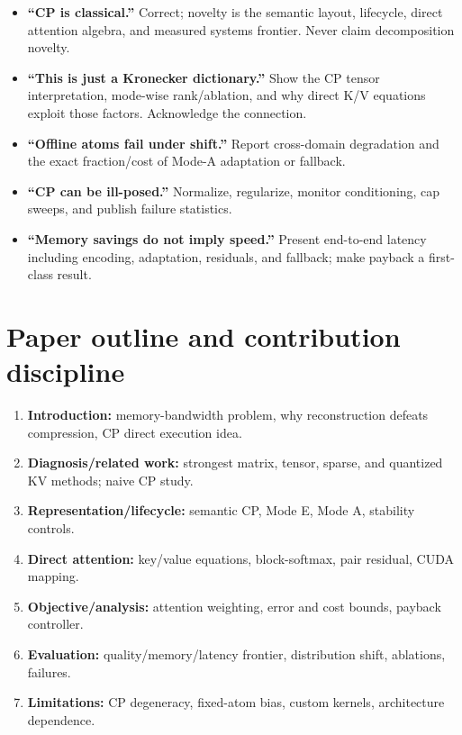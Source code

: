 \documentclass[11pt]{article}
\begin{document}
\begin{itemize}[leftmargin=1.5em,itemsep=2pt]
\item \textbf{``CP is classical.''} Correct; novelty is the semantic layout, lifecycle, direct
attention algebra, and measured systems frontier. Never claim decomposition novelty.
\item \textbf{``This is just a Kronecker dictionary.''} Show the CP tensor interpretation, mode-wise
rank/ablation, and why direct K/V equations exploit those factors. Acknowledge the connection.
\item \textbf{``Offline atoms fail under shift.''} Report cross-domain degradation and the exact
fraction/cost of Mode-A adaptation or fallback.
\item \textbf{``CP can be ill-posed.''} Normalize, regularize, monitor conditioning, cap sweeps, and
publish failure statistics.
\item \textbf{``Memory savings do not imply speed.''} Present end-to-end latency including encoding,
adaptation, residuals, and fallback; make payback a first-class result.
\end{itemize}

\section{Paper outline and contribution discipline}

\begin{enumerate}[leftmargin=1.55em,itemsep=3pt]
\item \textbf{Introduction:} memory-bandwidth problem, why reconstruction defeats compression, CP
direct execution idea.
\item \textbf{Diagnosis/related work:} strongest matrix, tensor, sparse, and quantized KV methods;
naive CP study.
\item \textbf{Representation/lifecycle:} semantic CP, Mode E, Mode A, stability controls.
\item \textbf{Direct attention:} key/value equations, block-softmax, pair residual, CUDA mapping.
\item \textbf{Objective/analysis:} attention weighting, error and cost bounds, payback controller.
\item \textbf{Evaluation:} quality/memory/latency frontier, distribution shift, ablations, failures.
\item \textbf{Limitations:} CP degeneracy, fixed-atom bias, custom kernels, architecture dependence.
\end{enumerate}
\end{document}
